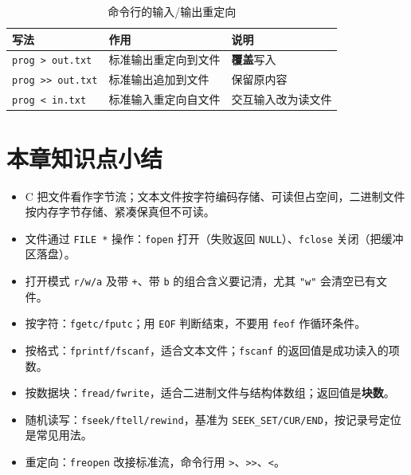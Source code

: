 \begin{table}[htbp]
\centering
\caption{命令行的输入/输出重定向}
\footnotesize
\begin{tabular}{@{}lll@{}}
\toprule
写法 & 作用 & 说明 \\
\midrule
\texttt{prog > out.txt} & 标准输出重定向到文件 & \textbf{覆盖}写入 \\
\texttt{prog >> out.txt} & 标准输出追加到文件 & 保留原内容 \\
\texttt{prog < in.txt} & 标准输入重定向自文件 & 交互输入改为读文件 \\
\bottomrule
\end{tabular}
\end{table}

\section{本章知识点小结}
\begin{itemize}
  \item C 把文件看作字节流；文本文件按字符编码存储、可读但占空间，二进制文件按内存字节存储、紧凑保真但不可读。
  \item 文件通过 \texttt{FILE *} 操作：\texttt{fopen} 打开（失败返回 \texttt{NULL}）、\texttt{fclose} 关闭（把缓冲区落盘）。
  \item 打开模式 \texttt{r/w/a} 及带 \texttt{+}、带 \texttt{b} 的组合含义要记清，尤其 \texttt{"w"} 会清空已有文件。
  \item 按字符：\texttt{fgetc/fputc}；用 \texttt{EOF} 判断结束，不要用 \texttt{feof} 作循环条件。
  \item 按格式：\texttt{fprintf/fscanf}，适合文本文件；\texttt{fscanf} 的返回值是成功读入的项数。
  \item 按数据块：\texttt{fread/fwrite}，适合二进制文件与结构体数组；返回值是\textbf{块数}。
  \item 随机读写：\texttt{fseek/ftell/rewind}，基准为 \texttt{SEEK\_SET/CUR/END}，按记录号定位是常见用法。
  \item 重定向：\texttt{freopen} 改接标准流，命令行用 \texttt{>}、\texttt{>>}、\texttt{<}。
\end{itemize}

